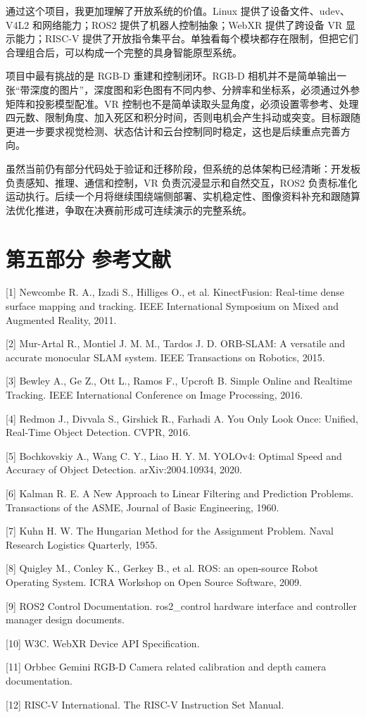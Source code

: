 \documentclass[UTF8,a4paper,zihao=-4]{ctexart}
\begin{document}
通过这个项目，我更加理解了开放系统的价值。Linux 提供了设备文件、udev、V4L2 和网络能力；ROS2 提供了机器人控制抽象；WebXR 提供了跨设备 VR 显示能力；RISC-V 提供了开放指令集平台。单独看每个模块都存在限制，但把它们合理组合后，可以构成一个完整的具身智能原型系统。

项目中最有挑战的是 RGB-D 重建和控制闭环。RGB-D 相机并不是简单输出一张“带深度的图片”，深度图和彩色图有不同内参、分辨率和坐标系，必须通过外参矩阵和投影模型配准。VR 控制也不是简单读取头显角度，必须设置零参考、处理四元数、限制角度、加入死区和积分时间，否则电机会产生抖动或突变。目标跟随更进一步要求视觉检测、状态估计和云台控制同时稳定，这也是后续重点完善方向。

虽然当前仍有部分代码处于验证和迁移阶段，但系统的总体架构已经清晰：开发板负责感知、推理、通信和控制，VR 负责沉浸显示和自然交互，ROS2 负责标准化运动执行。后续一个月将继续围绕端侧部署、实机稳定性、图像资料补充和跟随算法优化推进，争取在决赛前形成可连续演示的完整系统。

\section*{第五部分 参考文献}

[1] Newcombe R. A., Izadi S., Hilliges O., et al. KinectFusion: Real-time dense surface mapping and tracking. IEEE International Symposium on Mixed and Augmented Reality, 2011.

[2] Mur-Artal R., Montiel J. M. M., Tardos J. D. ORB-SLAM: A versatile and accurate monocular SLAM system. IEEE Transactions on Robotics, 2015.

[3] Bewley A., Ge Z., Ott L., Ramos F., Upcroft B. Simple Online and Realtime Tracking. IEEE International Conference on Image Processing, 2016.

[4] Redmon J., Divvala S., Girshick R., Farhadi A. You Only Look Once: Unified, Real-Time Object Detection. CVPR, 2016.

[5] Bochkovskiy A., Wang C. Y., Liao H. Y. M. YOLOv4: Optimal Speed and Accuracy of Object Detection. arXiv:2004.10934, 2020.

[6] Kalman R. E. A New Approach to Linear Filtering and Prediction Problems. Transactions of the ASME, Journal of Basic Engineering, 1960.

[7] Kuhn H. W. The Hungarian Method for the Assignment Problem. Naval Research Logistics Quarterly, 1955.

[8] Quigley M., Conley K., Gerkey B., et al. ROS: an open-source Robot Operating System. ICRA Workshop on Open Source Software, 2009.

[9] ROS2 Control Documentation. ros2\_control hardware interface and controller manager design documents.

[10] W3C. WebXR Device API Specification.

[11] Orbbec Gemini RGB-D Camera related calibration and depth camera documentation.

[12] RISC-V International. The RISC-V Instruction Set Manual.
\end{document}
